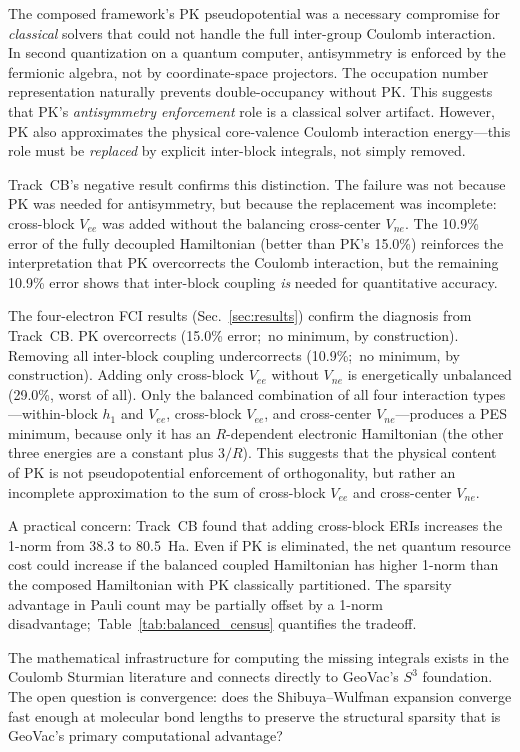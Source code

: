 \documentclass[aps,pra,twocolumn,superscriptaddress,longbibliography]{revtex4-2}
\begin{document}
The composed framework's PK pseudopotential was a necessary compromise
for \emph{classical} solvers that could not handle the full
inter-group Coulomb interaction.  In second quantization on a quantum
computer, antisymmetry is enforced by the fermionic algebra, not by
coordinate-space projectors.  The occupation number representation
naturally prevents double-occupancy without PK.  This suggests that
PK's \emph{antisymmetry enforcement} role is a classical solver
artifact.  However, PK also approximates the physical core-valence
Coulomb interaction energy---this role must be \emph{replaced} by
explicit inter-block integrals, not simply removed.

Track~CB's negative result confirms this distinction.  The failure
was not because PK was needed for antisymmetry, but because the
replacement was incomplete: cross-block $V_{ee}$ was added without
the balancing cross-center $V_{ne}$.  The 10.9\% error of the fully
decoupled Hamiltonian (better than PK's 15.0\%) reinforces the
interpretation that PK overcorrects the Coulomb interaction, but the
remaining 10.9\% error shows that inter-block coupling \emph{is}
needed for quantitative accuracy.

The four-electron FCI results (Sec.~\ref{sec:results}) confirm the
diagnosis from Track~CB.  PK overcorrects (15.0\% error;\ no minimum, by
construction).  Removing all inter-block coupling undercorrects (10.9\%;\ no
minimum, by construction).
Adding only cross-block $V_{ee}$ without $V_{ne}$ is energetically
unbalanced (29.0\%, worst of all).  Only the balanced combination of
all four interaction types---within-block $h_1$ and $V_{ee}$,
cross-block $V_{ee}$, and cross-center $V_{ne}$---produces a PES
minimum, because only it has an $R$-dependent electronic Hamiltonian
(the other three energies are a constant plus $3/R$).  This suggests that
the physical content of PK is not pseudopotential enforcement of
orthogonality, but rather an incomplete approximation to the sum of
cross-block $V_{ee}$ and cross-center $V_{ne}$.

A practical concern: Track~CB found that adding cross-block ERIs
increases the 1-norm from 38.3 to 80.5~Ha.  Even if PK is
eliminated, the net quantum resource cost could increase if the
balanced coupled Hamiltonian has higher 1-norm than the composed
Hamiltonian with PK classically partitioned.  The sparsity advantage in
Pauli count may be partially offset by a 1-norm disadvantage;\
Table~\ref{tab:balanced_census} quantifies the tradeoff.

The mathematical infrastructure for computing the missing integrals
exists in the Coulomb Sturmian literature and connects directly to
GeoVac's $S^3$ foundation.  The open question is convergence: does
the Shibuya--Wulfman expansion converge fast enough at molecular bond
lengths to preserve the structural sparsity that is GeoVac's primary
computational advantage?
\end{document}
